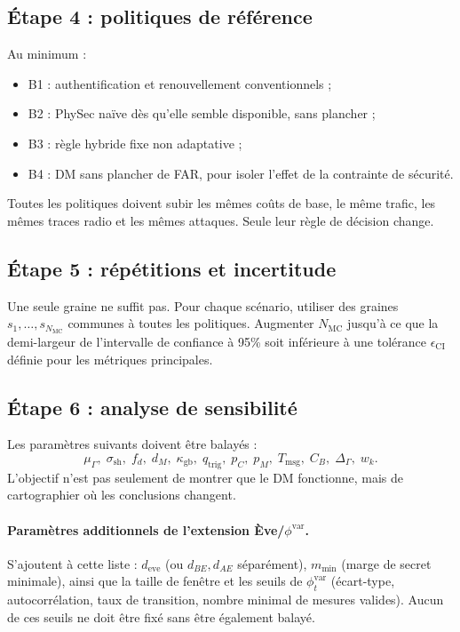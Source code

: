 \documentclass[conference,a4paper]{IEEEtran}
\begin{document}
\subsection{Étape 4 : politiques de référence}
Au minimum :
\begin{itemize}
    \item B1 : authentification et renouvellement conventionnels ;
    \item B2 : PhySec naïve dès qu'elle semble disponible, sans plancher ;
    \item B3 : règle hybride fixe non adaptative ;
    \item B4 : DM sans plancher de FAR, pour isoler l'effet de la contrainte de sécurité.
\end{itemize}
Toutes les politiques doivent subir les mêmes coûts de base, le même trafic, les mêmes traces radio et les mêmes attaques. Seule leur règle de décision change.

\subsection{Étape 5 : répétitions et incertitude}
Une seule graine ne suffit pas. Pour chaque scénario, utiliser des graines $s_1,\ldots,s_{N_{\mathrm{MC}}}$ communes à toutes les politiques. Augmenter $N_{\mathrm{MC}}$ jusqu'à ce que la demi-largeur de l'intervalle de confiance à 95\% soit inférieure à une tolérance $\epsilon_{\mathrm{CI}}$ définie pour les métriques principales.

\subsection{Étape 6 : analyse de sensibilité}
Les paramètres suivants doivent être balayés :
\begin{equation}
\mu_{\Gamma},\;\sigma_{\mathrm{sh}},\;f_d,\;d_M,\;
\kappa_{\mathrm{gb}},\;q_{\mathrm{trig}},\;p_C,\;p_M,
\;T_{\mathrm{msg}},\;C_B,\;\Delta_{\Gamma},\;w_k.
\end{equation}
L'objectif n'est pas seulement de montrer que le DM fonctionne, mais de cartographier où les conclusions changent.

\paragraph{Paramètres additionnels de l'extension Ève/$\phi^{\mathrm{var}}$.} S'ajoutent à cette liste : $d_{\mathrm{eve}}$ (ou $d_{BE},d_{AE}$ séparément), $m_{\min}$ (marge de secret minimale), ainsi que la taille de fenêtre et les seuils de $\phi_t^{\mathrm{var}}$ (écart-type, autocorrélation, taux de transition, nombre minimal de mesures valides). Aucun de ces seuils ne doit être fixé sans être également balayé.
\end{document}
